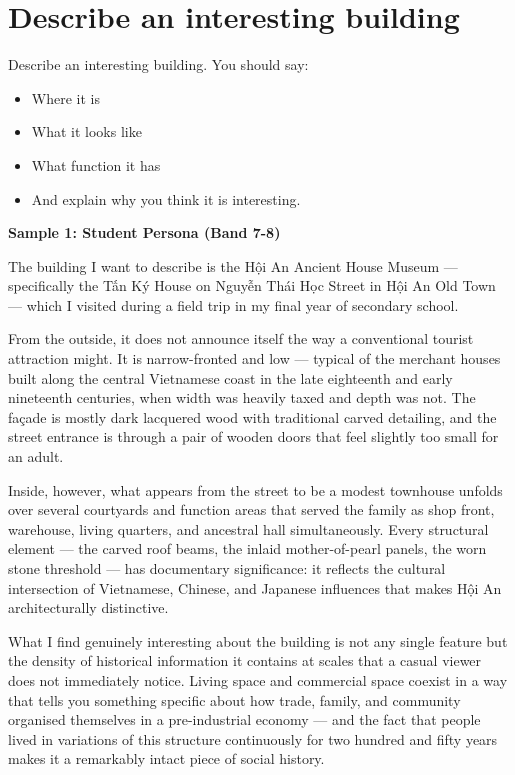 \section{Describe an interesting building}
\begin{ieltsprompt}
Describe an interesting building.
You should say:
\begin{itemize}[leftmargin=2em, itemsep=2pt]
\item Where it is
\item What it looks like
\item What function it has
\item And explain why you think it is interesting.
\end{itemize}
\end{ieltsprompt}
\begin{ieltsanswer}
\textbf{Sample 1: Student Persona (Band 7-8)}

The building I want to describe is the Hội An Ancient House Museum — specifically the Tấn Ký House on Nguyễn Thái Học Street in Hội An Old Town — which I visited during a field trip in my final year of secondary school.

From the outside, it does not announce itself the way a conventional tourist attraction might. It is narrow-fronted and low — typical of the merchant houses built along the central Vietnamese coast in the late eighteenth and early nineteenth centuries, when width was heavily taxed and depth was not. The façade is mostly dark lacquered wood with traditional carved detailing, and the street entrance is through a pair of wooden doors that feel slightly too small for an adult.

Inside, however, what appears from the street to be a modest townhouse unfolds over several courtyards and function areas that served the family as shop front, warehouse, living quarters, and ancestral hall simultaneously. Every structural element — the carved roof beams, the inlaid mother-of-pearl panels, the worn stone threshold — has documentary significance: it reflects the cultural intersection of Vietnamese, Chinese, and Japanese influences that makes Hội An architecturally distinctive.

What I find genuinely interesting about the building is not any single feature but the density of historical information it contains at scales that a casual viewer does not immediately notice. Living space and commercial space coexist in a way that tells you something specific about how trade, family, and community organised themselves in a pre-industrial economy — and the fact that people lived in variations of this structure continuously for two hundred and fifty years makes it a remarkably intact piece of social history.


\end{ieltsanswer}
